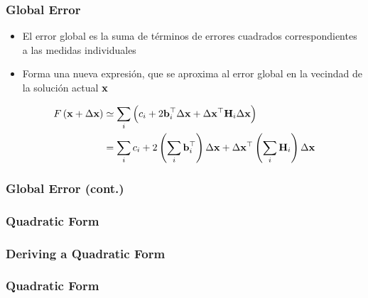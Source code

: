 \begin{frame}
    \frametitle{Global Error}
    
    \begin{itemize}
        \item El error global es la suma de términos de errores cuadrados correspondientes a las medidas individuales
        \item Forma una nueva expresión, que se aproxima al error global en la vecindad de la solución actual $\boldsymbol{\mathbf{x}}$
    \end{itemize}
    
    \begin{align*}
        F\left(\boldsymbol{\mathbf{x}} + \Delta \boldsymbol{\mathbf{x}} \right) &\simeq \sum_{i} \left( c_{i} + 2 \boldsymbol{\mathbf{b}}^{\top}_{i} \Delta \boldsymbol{\mathbf{x}} + \Delta \boldsymbol{\mathbf{x}}^{\top} \boldsymbol{\mathbf{H}}_{i} \Delta \boldsymbol{\mathbf{x}} \right) \\
        &= \sum_{i} c_{i} + 2 \left( \sum_{i} \boldsymbol{\mathbf{b}}^{\top}_{i} \right) \Delta \boldsymbol{\mathbf{x}} + \Delta \boldsymbol{\mathbf{x}}^{\top} \left( \sum_{i} \boldsymbol{\mathbf{H}}_{i} \right) \Delta \boldsymbol{\mathbf{x}}
    \end{align*}
    
    
\end{frame}

\begin{frame}
    \frametitle{Global Error (cont.)}
    
\end{frame}

\begin{frame}
    \frametitle{Quadratic Form}
    
\end{frame}

\begin{frame}
    \frametitle{Deriving a Quadratic Form}
    
\end{frame}

\begin{frame}
    \frametitle{Quadratic Form}
    
\end{frame}

